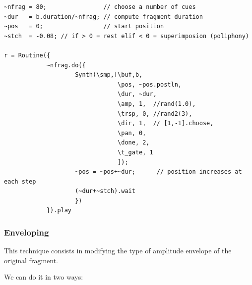 \begin{lstlisting}[frame=single] 
~nfrag = 80;                // choose a number of cues
~dur   = b.duration/~nfrag; // compute fragment duration
~pos   = 0;                 // start position
~stch  = -0.08; // if > 0 = rest elif < 0 = superimposion (poliphony)

r = Routine({
            ~nfrag.do({
                    Synth(\smp,[\buf,b,
                                \pos, ~pos.postln,
                                \dur, ~dur,
                                \amp, 1,  //rand(1.0),
                                \trsp, 0, //rand2(3),
                                \dir, 1,  // [1,-1].choose,
                                \pan, 0,
                                \done, 2,
                                \t_gate, 1
                                ]);
                    ~pos = ~pos+~dur;      // position increases at each step
                    (~dur+~stch).wait
	                })
            }).play
\end{lstlisting}

\subsubsection{Enveloping}\label{enveloping}

This technique consists in modifying the type of amplitude envelope of the original fragment.

We can do it in two ways:

